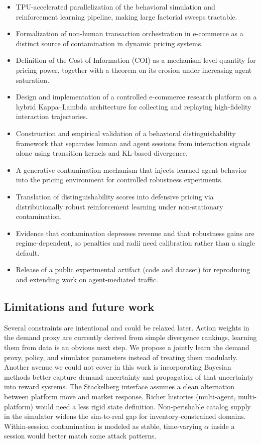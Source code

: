 \begin{itemize}
    \item TPU-accelerated parallelization of the behavioral simulation and reinforcement learning pipeline, making large factorial sweeps tractable.
    \item Formalization of non-human transaction orchestration in e-commerce as a distinct source of contamination in dynamic pricing systems.
    \item Definition of the Cost of Information (COI) as a mechanism-level quantity for pricing power, together with a theorem on its erosion under increasing agent saturation.
    \item Design and implementation of a controlled e-commerce research platform on a hybrid Kappa--Lambda architecture for collecting and replaying high-fidelity interaction trajectories.
    \item Construction and empirical validation of a behavioral distinguishability framework that separates human and agent sessions from interaction signals alone using transition kernels and KL-based divergence.
    \item A generative contamination mechanism that injects learned agent behavior into the pricing environment for controlled robustness experiments.
    \item Translation of distinguishability scores into defensive pricing via distributionally robust reinforcement learning under non-stationary contamination.
    \item Evidence that contamination depresses revenue and that robustness gains are regime-dependent, so penalties and radii need calibration rather than a single default.
    \item Release of a public experimental artifact (code and dataset) for reproducing and extending work on agent-mediated traffic.
\end{itemize}

\subsection{Limitations and future work}

Several constraints are intentional and could be relaxed later. Action weights in the demand proxy are currently derived from simple divergence rankings, learning them from data is an obvious next step. We propose a jointly learn the demand proxy, policy, and simulator parameters instead of treating them modularly. Another avenue we could not cover in this work is incorporating Bayesian methods better capture demand uncertainty and propagation of that uncertainty into reward systems.
The Stackelberg interface assumes a clean alternation between platform move and market response. Richer histories (multi-agent, multi-platform) would need a less rigid state definition. Non-perishable catalog supply in the simulator widens the sim-to-real gap for inventory-constrained domains. Within-session contamination is modeled as stable, time-varying $\alpha$ inside a session would better match some attack patterns.

